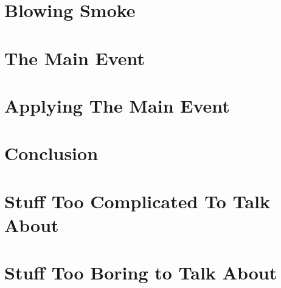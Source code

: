 \documentclass[12pt]{report}   %
\begin{document}
\chapter{Blowing Smoke}

\clearpage{\pagestyle{empty}\cleardoublepage}

\chapter{The Main Event}

\clearpage{\pagestyle{empty}\cleardoublepage}

\chapter{Applying The Main Event}

\clearpage{\pagestyle{empty}\cleardoublepage}

\chapter{Conclusion}

\clearpage{\pagestyle{empty}\cleardoublepage}

\appendix
\chapter{Stuff Too Complicated To Talk About}

\clearpage{\pagestyle{empty}\cleardoublepage}

\chapter{Stuff Too Boring to Talk About}

\clearpage{\pagestyle{empty}\cleardoublepage}



\begin{spacing}{0.9}
  
\end{spacing}
\end{document}
